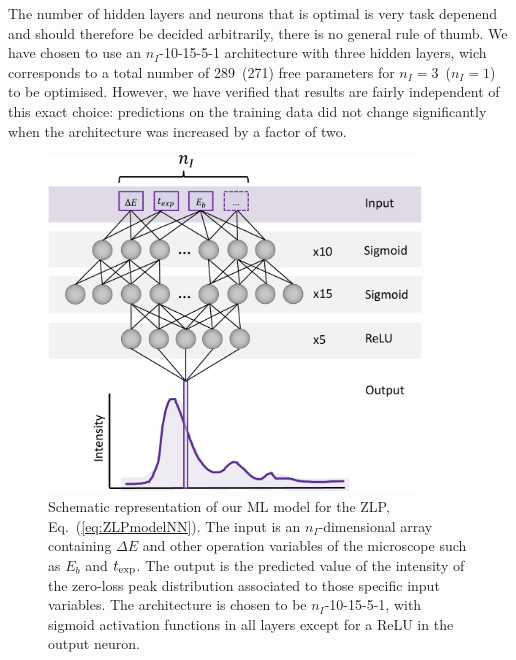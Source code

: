 The number of hidden layers and neurons that is optimal is very task depenend and
should therefore be decided arbitrarily, 
there is no general rule of thumb. 
%
We have chosen to use an $n_I$-10-15-5-1 architecture with three hidden layers, wich corresponds to a total
number of 289~(271) free parameters for $n_I=3$~($n_I=1$) to be optimised.
%
However, we have verified that results are fairly independent of this exact choice:
predictions on the training data did not change significantly when the architecture 
was increased by a factor of two.

  
\begin{figure}[t]
    \centering
    \includegraphics[width=99mm]{plots/architecture.pdf}
    \caption{Schematic representation of our ML model for the ZLP, Eq.~(\ref{eq:ZLPmodelNN}).
      The input is an $n_I$-dimensional array containing $\Delta E$ and other
      operation variables of the microscope such as $E_b$ and $t_{\rm exp}$.
      The output is the predicted value of the intensity of the zero-loss peak
      distribution associated to those specific input variables.
      The architecture is chosen to be $n_I$-10-15-5-1, with sigmoid activation functions
      in all layers except for a ReLU in the output neuron.
    }
    \label{fig:architecture}
\end{figure}


